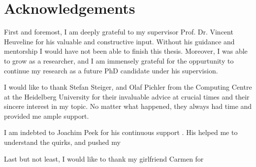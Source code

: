 \chapter*{Acknowledgements}
\thispagestyle{empty}

First and foremost, I am deeply grateful to my supervisor Prof. Dr. Vincent Heuveline for his valuable and constructive input.
Without his guidance and mentorship I would have not been able to finish this thesis.
Moreover, I was able to grow as a researcher, and I am immensely grateful for the oppurtunity to continue my research as a future PhD candidate under his supervision.

I would like to thank Stefan Steiger, and Olaf Pichler from the Computing Centre at the Heidelberg University for their invaluable advice at crucial times and their sincere interest in my topic.
No matter what happened, they always had time and provided me ample support.

I am indebted to Joachim Peek for his continuous support .
His helped me to understand the quirks, and pushed my 

Last but not least, I would like to thank my girlfriend Carmen for 